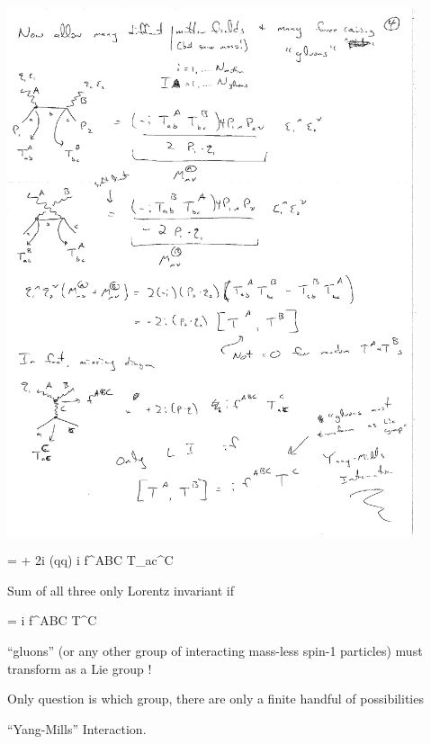 {\begin{minipage}{0.4\textwidth}
\includegraphics[width=0.9\textwidth]{./comptonScattering7.pdf}
\end{minipage} %
\begin{minipage}{0.45\textwidth}
\be
= + 2i (q\cdot q) i f^{ABC} T_{ac}^C 
\ee
\end{minipage} %

Sum of all three only Lorentz invariant if 

\be
[T^A, T^B] = i f^{ABC} T^C
\ee


``gluons'' (or any other group of interacting mass-less spin-1 particles) must transform as a Lie group ! 

Only question is which group, there are only a finite handful of possibilities


``Yang-Mills'' Interaction. 


}


